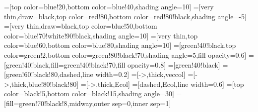 \tikzset{>=latex} %
\contourlength{1.8pt}

=[top color=blue!20,bottom color=blue!40,shading angle=10]
=[very thin,draw=black,top color=red!80,bottom color=red!80!black,shading angle=-5]
=[very thin,draw=black,top color=blue!50,bottom color=blue!70!white!90!black,shading angle=10]
=[very thin,top color=blue!60,bottom color=blue!80,shading angle=10]
=[green!40!black,top color=green!2,bottom color=green!80!black!70,shading angle=5,fill opacity=0.6]
=[green!40!black,fill=green!40!black!70,fill opacity=0.8]
=[green!40!black]
=[green!60!black!80,dashed,line width=0.2]
=[->,thick,veccol]
=[->,thick,blue!80!black!80]
=[->,thick,Ecol]
=[dashed,Ecol,line width=0.6]
=[top color=black!5,bottom color=black!15,shading angle=30]
=[fill=green!70!black!8,midway,outer sep=0,inner sep=1]
\def\L{2.2}
\def\H{2.2}
\def\W{0.30}
\def\Nx{5}
\def\Ny{5}



